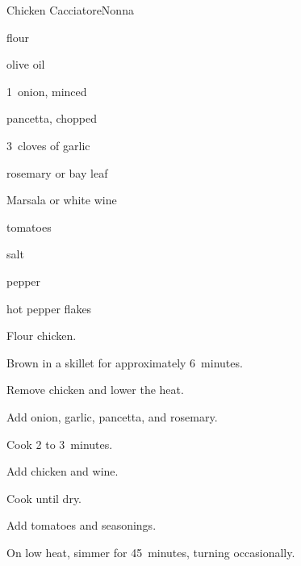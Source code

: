 \begin{recipe}{Chicken Cacciatore}{Nonna}{}

\begin{ingredients}
\item flour
\item \C{\quarter} olive oil
\item 1~onion, minced
\item {} pancetta, chopped 
\item 3~cloves of garlic
\item {} rosemary or bay leaf
\item {} Marsala or white wine
\item {} tomatoes
\item salt
\item pepper
\item hot pepper flakes
\end{ingredients}

\begin{directions}
\item Flour chicken.
\item Brown in a skillet for approximately 6~minutes.
\item Remove chicken and lower the heat.
\item Add onion, garlic, pancetta, and rosemary.
\item Cook 2 to 3~minutes.
\item Add chicken and wine.
\item Cook until dry.
\item Add tomatoes and seasonings.
\item On low heat, simmer for 45~minutes, turning occasionally.
\end{directions}

\end{recipe}
